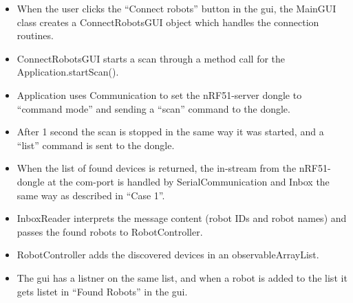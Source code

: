 \begin{itemize}
    \item When the user clicks the ``Connect robots'' button in the \acrshort{gui}, the MainGUI class creates a ConnectRobotsGUI object which handles the connection routines.
    \item ConnectRobotsGUI starts a scan through a method call for the Application.startScan().
    \item Application uses Communication to set the nRF51-server dongle to ``command mode'' and sending a ``scan'' command to the dongle.
    \item After 1 second the scan is stopped in the same way it was started, and a ``list'' command is sent to the dongle.
    \item When the list of found devices is returned, the in-stream from the nRF51-dongle at the \acrshort{com}-port is handled by SerialCommunication and Inbox the same way as described in ``Case 1''.
    \item InboxReader interprets the message content (robot IDs and robot names) and passes the found robots to RobotController.
    \item RobotController adds the discovered devices in an observableArrayList.
    \item The \acrshort{gui} has a listner on the same list, and when a robot is added to the list it gets listet in ``Found Robots'' in the \acrshort{gui}.
\end{itemize}
\vspace*{20pt}
